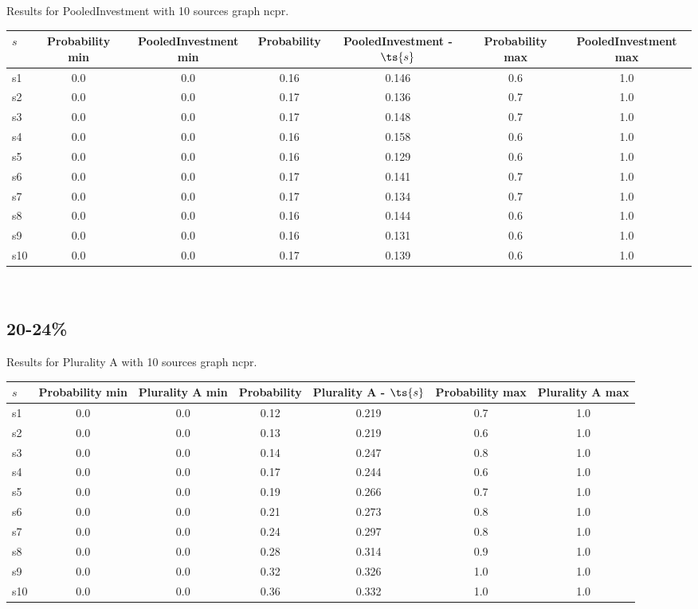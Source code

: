 \documentclass{article}
\begin{document}
\noindent Results for PooledInvestment with 10 sources graph ncpr.

\noindent\begin{tabular}{|l|c|c|c|c|c|c|}
\hline
$s$& Probability min & PooledInvestment min & Probability & PooledInvestment - $\ts{s}$ & Probability max & PooledInvestment max\\
\hline
s1 &0.0 & 0.0 & 0.16 & 0.146 & 0.6 & 1.0\\
\hline
s2 &0.0 & 0.0 & 0.17 & 0.136 & 0.7 & 1.0\\
\hline
s3 &0.0 & 0.0 & 0.17 & 0.148 & 0.7 & 1.0\\
\hline
s4 &0.0 & 0.0 & 0.16 & 0.158 & 0.6 & 1.0\\
\hline
s5 &0.0 & 0.0 & 0.16 & 0.129 & 0.6 & 1.0\\
\hline
s6 &0.0 & 0.0 & 0.17 & 0.141 & 0.7 & 1.0\\
\hline
s7 &0.0 & 0.0 & 0.17 & 0.134 & 0.7 & 1.0\\
\hline
s8 &0.0 & 0.0 & 0.16 & 0.144 & 0.6 & 1.0\\
\hline
s9 &0.0 & 0.0 & 0.16 & 0.131 & 0.6 & 1.0\\
\hline
s10 &0.0 & 0.0 & 0.17 & 0.139 & 0.6 & 1.0\\
\hline
\end{tabular}\\

\newpage

\subsection{20-24\%}

\noindent Results for Plurality A with 10 sources graph ncpr.

\noindent\begin{tabular}{|l|c|c|c|c|c|c|}
\hline
$s$& Probability min & Plurality A min & Probability & Plurality A - $\ts{s}$ & Probability max & Plurality A max\\
\hline
s1 &0.0 & 0.0 & 0.12 & 0.219 & 0.7 & 1.0\\
\hline
s2 &0.0 & 0.0 & 0.13 & 0.219 & 0.6 & 1.0\\
\hline
s3 &0.0 & 0.0 & 0.14 & 0.247 & 0.8 & 1.0\\
\hline
s4 &0.0 & 0.0 & 0.17 & 0.244 & 0.6 & 1.0\\
\hline
s5 &0.0 & 0.0 & 0.19 & 0.266 & 0.7 & 1.0\\
\hline
s6 &0.0 & 0.0 & 0.21 & 0.273 & 0.8 & 1.0\\
\hline
s7 &0.0 & 0.0 & 0.24 & 0.297 & 0.8 & 1.0\\
\hline
s8 &0.0 & 0.0 & 0.28 & 0.314 & 0.9 & 1.0\\
\hline
s9 &0.0 & 0.0 & 0.32 & 0.326 & 1.0 & 1.0\\
\hline
s10 &0.0 & 0.0 & 0.36 & 0.332 & 1.0 & 1.0\\
\hline
\end{tabular}\\
\end{document}
